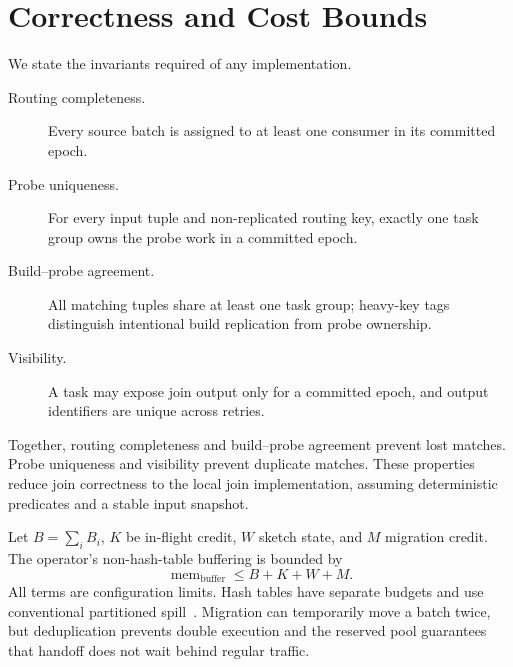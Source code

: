 \section{Correctness and Cost Bounds}
\label{sec:correctness}

We state the invariants required of any implementation.

\begin{description}
  \item[Routing completeness.] Every source batch is assigned to at least one
  consumer in its committed epoch.
  \item[Probe uniqueness.] For every input tuple and non-replicated routing
  key, exactly one task group owns the probe work in a committed epoch.
  \item[Build--probe agreement.] All matching tuples share at least one task
  group; heavy-key tags distinguish intentional build replication from probe
  ownership.
  \item[Visibility.] A task may expose join output only for a committed epoch,
  and output identifiers are unique across retries.
\end{description}

Together, routing completeness and build--probe agreement prevent lost
matches.  Probe uniqueness and visibility prevent duplicate matches.  These
properties reduce join correctness to the local join implementation, assuming
deterministic predicates and a stable input snapshot.

Let $B=\sum_i B_i$, $K$ be in-flight credit, $W$ sketch state, and $M$ migration
credit.  The operator's non-hash-table buffering is bounded by
\begin{equation}
 \operatorname{mem}_{\mathrm{buffer}} \le B+K+W+M.
 \label{eq:memory}
\end{equation}
All terms are configuration limits.  Hash tables have separate budgets and use
conventional partitioned spill~\cite{graefe1993query}.  Migration can
temporarily move a batch twice, but
deduplication prevents double execution and the reserved pool guarantees that
handoff does not wait behind regular traffic.

